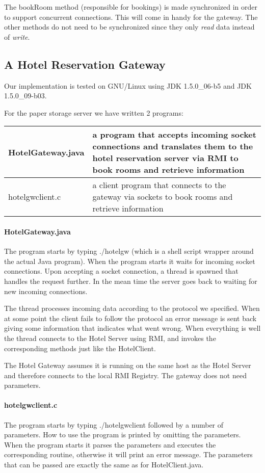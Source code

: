 \documentclass[a4paper,10pt]{article}
\begin{document}
The bookRoom method (responsible for bookings) is made synchronized in order to support concurrent connections. This will come in handy for the gateway. The other methods do not need to be synchronized since they only \emph{read} data instead of \emph{write}.

\subsection{A Hotel Reservation Gateway}

Our implementation is tested on GNU/Linux using JDK 1.5.0\_06-b5 and JDK 1.5.0\_09-b03.

For the paper storage server we have written 2 programs:
\begin{center}
\begin{tabular}{ l | p{8.2cm} }
HotelGateway.java & a program that accepts incoming socket connections and translates them to the hotel reservation server via RMI to book rooms and retrieve information\\ \hline
hotelgwclient.c & a client program that connects to the gateway via sockets to book rooms and retrieve information\\
\end{tabular}
\end{center}

\paragraph{HotelGateway.java}
The program starts by typing ./hotelgw (which is a shell script wrapper around the actual Java program). When the program starts it waits for incoming socket connections. Upon accepting a socket connection, a thread is spawned that handles the request further. In the mean time the server goes back to waiting for new incoming connections.

The thread processes incoming data according to the protocol we specified. When at some point the client fails to follow the protocol an error message is sent back giving some information that indicates what went wrong. When everything is well the thread connects to the Hotel Server using RMI, and invokes the corresponding methods just like the HotelClient.

The Hotel Gateway assumes it is running on the same host as the Hotel Server and therefore connects to the local RMI Registry. The gateway does not need parameters.

\paragraph{hotelgwclient.c}
The program starts by typing ./hotelgwclient followed by a number of parameters. How to use the program is printed by omitting the parameters. When the program starts it parses the parameters and executes the corresponding routine, otherwise it will print an error message. The parameters that can be passed are exactly the same as for HotelClient.java.
\end{document}
